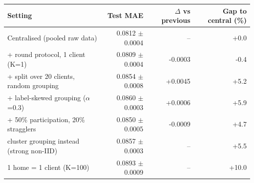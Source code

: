 \begin{tabular}{lrrr}
\toprule
Setting & Test MAE & $\Delta$ vs previous & Gap to central (\%) \\
\midrule
Centralised (pooled raw data) & 0.0812 $\pm$ 0.0004 & -- & +0.0 \\
+ round protocol, 1 client (K=1) & 0.0809 $\pm$ 0.0004 & -0.0003 & -0.4 \\
+ split over 20 clients, random grouping & 0.0854 $\pm$ 0.0008 & +0.0045 & +5.2 \\
+ label-skewed grouping ($\alpha$=0.3) & 0.0860 $\pm$ 0.0003 & +0.0006 & +5.9 \\
+ 50\% participation, 20\% stragglers & 0.0850 $\pm$ 0.0005 & -0.0009 & +4.7 \\
cluster grouping instead (strong non-IID) & 0.0857 $\pm$ 0.0003 & -- & +5.5 \\
1 home = 1 client (K=100) & 0.0893 $\pm$ 0.0009 & -- & +10.0 \\
\bottomrule
\end{tabular}
